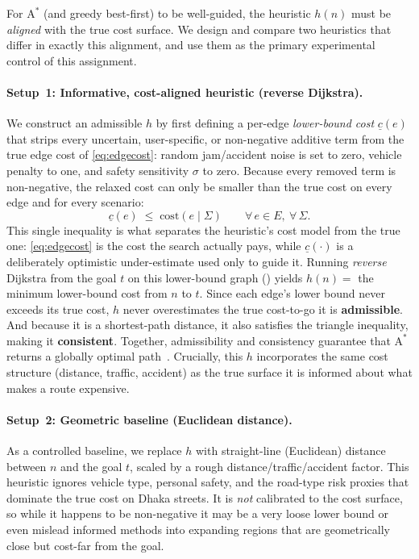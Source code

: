 \documentclass{ai-lab-report}
\begin{document}
\label{sec:a1heur}

\medbreak

For $\text{A}^\ast$ (and greedy best-first) to be well-guided, the heuristic $h(n)$ must be \emph{aligned} with the true cost surface. We design and compare two heuristics that differ in exactly this alignment, and use them as the primary experimental control of this assignment.

\paragraph{Setup~1: Informative, cost-aligned heuristic (reverse Dijkstra).}
We construct an admissible $h$ by first defining a per-edge \emph{lower-bound cost} $\underline{c}(e)$ that strips every uncertain, 
user-specific, or non-negative additive term from the true edge cost of \cref{eq:edgecost}: random jam/accident noise is set to zero, 
vehicle penalty to one, and safety sensitivity $\sigma$ to zero. Because every removed term is non-negative, the relaxed cost can only 
be smaller than the true cost on every edge and for every scenario:
\begin{equation}
\underline{c}(e)\;\le\;\mathrm{cost}(e\mid\Sigma)\qquad\forall\,e\in E,\ \forall\,\Sigma .
\label{eq:lbcost}
\end{equation}
This single inequality is what separates the heuristic's cost model from the true one: \cref{eq:edgecost} is the cost the search actually pays, while $\underline{c}(\cdot)$ is a deliberately optimistic under-estimate used only to guide it. Running \emph{reverse} Dijkstra from the goal $t$ on this lower-bound graph () yields $h(n)=$ the minimum lower-bound cost from $n$ to $t$. Since each edge's lower bound never exceeds its true cost, $h$ never overestimates the true cost-to-go it is \textbf{admissible}. And because it is a shortest-path distance, it also satisfies the triangle inequality, making it \textbf{consistent}. Together, admissibility and consistency guarantee that $\text{A}^\ast$ returns a globally optimal path~\citep{hart1968astar}. Crucially, this $h$ incorporates the same cost structure (distance, traffic, accident) as the true surface it is informed about what makes a route expensive.

\paragraph{Setup~2: Geometric baseline (Euclidean distance).}
As a controlled baseline, we replace $h$ with straight-line (Euclidean) distance between $n$ and the goal $t$, scaled by a rough distance/traffic/accident factor. This heuristic ignores vehicle type, personal safety, and the road-type risk proxies that dominate the true cost on Dhaka streets. It is \emph{not} calibrated to the cost surface, so while it happens to be non-negative it may be a very loose lower bound or even mislead informed methods into expanding regions that are geometrically close but cost-far from the goal.
\end{document}
